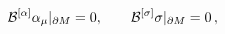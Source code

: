 \begin{equation}
{\cal B}^{[\alpha]} \alpha_\mu |_{\partial M}=0,\qquad
{\cal B}^{[\sigma]} \sigma |_{\partial M}=0 \,,\label{bops}
\end{equation}

